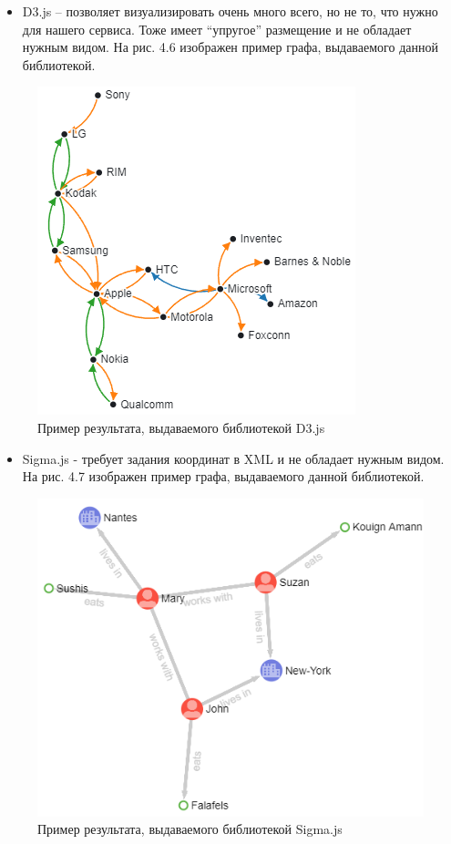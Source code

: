\newpage
\begin{itemize}
\item D3.js – позволяет визуализировать очень много всего, но не то, что нужно для нашего сервиса. Тоже имеет “упругое” размещение и не обладает нужным видом.  На рис. 4.6 изображен пример графа, выдаваемого данной библиотекой.
\end{itemize}
\begin{figure}[h]
	\center
	\includegraphics [scale=1] {my_folder/images/my/17}
	\caption{Пример результата, выдаваемого библиотекой D3.js}
	\label{fig:17}
\end{figure}
\begin{itemize}
\item Sigma.js - требует задания координат в XML и не обладает нужным видом.  На рис. 4.7 изображен пример графа, выдаваемого данной библиотекой.
\end{itemize}
\begin{figure}[h]
	\center
	\includegraphics [scale=1] {my_folder/images/my/18}
	\caption{Пример результата, выдаваемого библиотекой Sigma.js}
	\label{fig:18}
\end{figure}
